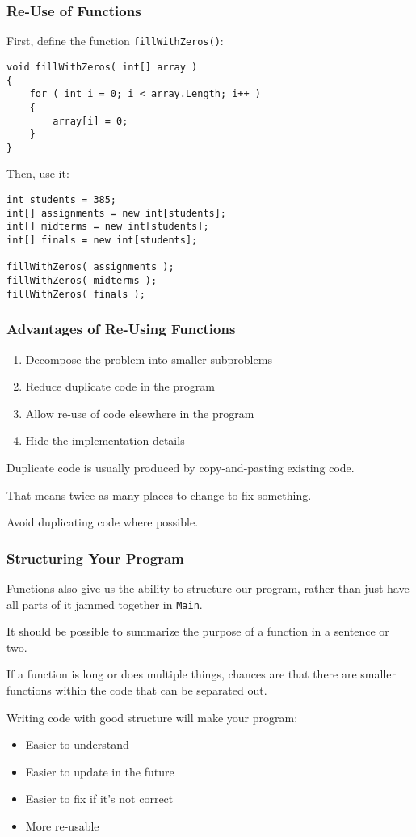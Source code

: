 \begin{frame}[fragile]
\frametitle{Re-Use of Functions}

First, define the function \texttt{fillWithZeros()}:

{\scriptsize
\begin{verbatim}
void fillWithZeros( int[] array ) 
{
    for ( int i = 0; i < array.Length; i++ )
    {
        array[i] = 0;
    }
}    
\end{verbatim}
}

Then, use it:
{\scriptsize
\begin{verbatim}
int students = 385;
int[] assignments = new int[students];
int[] midterms = new int[students];
int[] finals = new int[students];

fillWithZeros( assignments );
fillWithZeros( midterms );
fillWithZeros( finals );
\end{verbatim}
}

\end{frame}

\begin{frame}
\frametitle{Advantages of Re-Using Functions}

\begin{enumerate}
	\item Decompose the problem into smaller subproblems
	\item Reduce duplicate code in the program
	\item Allow re-use of code elsewhere in the program
	\item Hide the implementation details
\end{enumerate}

Duplicate code is usually produced by copy-and-pasting existing code.

That means twice as many places to change to fix something.

Avoid duplicating code where possible.

\end{frame}

\begin{frame}
\frametitle{Structuring Your Program}
Functions also give us the ability to structure our program, rather than just have all parts of it jammed together in \texttt{Main}.

It should be possible to summarize the purpose of a function in a sentence or two. 

If a function is long or does multiple things, chances are that there are smaller functions within the code that can be separated out. 

Writing code with good structure will make your program:
\begin{itemize}
	\item Easier to understand
	\item Easier to update in the future
	\item Easier to fix if it's not correct
	\item More re-usable
\end{itemize}

\end{frame}

